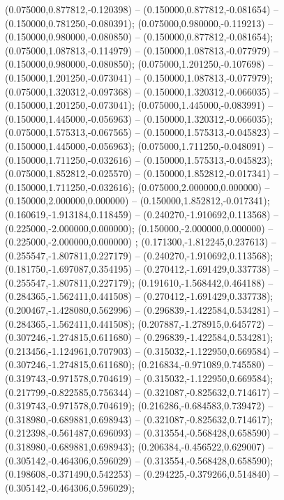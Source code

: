 (0.075000,0.877812,-0.120398) -- (0.150000,0.877812,-0.081654) -- (0.150000,0.781250,-0.080391);
 (0.075000,0.980000,-0.119213) -- (0.150000,0.980000,-0.080850) -- (0.150000,0.877812,-0.081654);
 (0.075000,1.087813,-0.114979) -- (0.150000,1.087813,-0.077979) -- (0.150000,0.980000,-0.080850);
 (0.075000,1.201250,-0.107698) -- (0.150000,1.201250,-0.073041) -- (0.150000,1.087813,-0.077979);
 (0.075000,1.320312,-0.097368) -- (0.150000,1.320312,-0.066035) -- (0.150000,1.201250,-0.073041);
 (0.075000,1.445000,-0.083991) -- (0.150000,1.445000,-0.056963) -- (0.150000,1.320312,-0.066035);
 (0.075000,1.575313,-0.067565) -- (0.150000,1.575313,-0.045823) -- (0.150000,1.445000,-0.056963);
 (0.075000,1.711250,-0.048091) -- (0.150000,1.711250,-0.032616) -- (0.150000,1.575313,-0.045823);
 (0.075000,1.852812,-0.025570) -- (0.150000,1.852812,-0.017341) -- (0.150000,1.711250,-0.032616);
 (0.075000,2.000000,0.000000) -- (0.150000,2.000000,0.000000) -- (0.150000,1.852812,-0.017341);
 (0.160619,-1.913184,0.118459) -- (0.240270,-1.910692,0.113568) -- (0.225000,-2.000000,0.000000);
 (0.150000,-2.000000,0.000000) -- (0.225000,-2.000000,0.000000) ;
 (0.171300,-1.812245,0.237613) -- (0.255547,-1.807811,0.227179) -- (0.240270,-1.910692,0.113568);
 (0.181750,-1.697087,0.354195) -- (0.270412,-1.691429,0.337738) -- (0.255547,-1.807811,0.227179);
 (0.191610,-1.568442,0.464188) -- (0.284365,-1.562411,0.441508) -- (0.270412,-1.691429,0.337738);
 (0.200467,-1.428080,0.562996) -- (0.296839,-1.422584,0.534281) -- (0.284365,-1.562411,0.441508);
 (0.207887,-1.278915,0.645772) -- (0.307246,-1.274815,0.611680) -- (0.296839,-1.422584,0.534281);
 (0.213456,-1.124961,0.707903) -- (0.315032,-1.122950,0.669584) -- (0.307246,-1.274815,0.611680);
 (0.216834,-0.971089,0.745580) -- (0.319743,-0.971578,0.704619) -- (0.315032,-1.122950,0.669584);
 (0.217799,-0.822585,0.756344) -- (0.321087,-0.825632,0.714617) -- (0.319743,-0.971578,0.704619);
 (0.216286,-0.684583,0.739472) -- (0.318980,-0.689881,0.698943) -- (0.321087,-0.825632,0.714617);
 (0.212398,-0.561487,0.696093) -- (0.313554,-0.568428,0.658590) -- (0.318980,-0.689881,0.698943);
 (0.206384,-0.456522,0.629007) -- (0.305142,-0.464306,0.596029) -- (0.313554,-0.568428,0.658590);
 (0.198608,-0.371490,0.542253) -- (0.294225,-0.379266,0.514840) -- (0.305142,-0.464306,0.596029);
